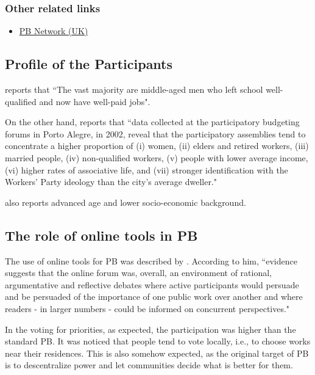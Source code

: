 \subsubsection{Other related links}
\begin{itemize}
	\item \href{http://pbnetwork.org.uk/}{PB Network (UK)}
\end{itemize}

\subsection{Profile of the Participants}
\cite{Masser2013} reports that ``The vast majority are middle-aged men who left school well-qualified and now have well-paid jobs". 

On the other hand, \cite{Goncalves2014} reports that ``data collected at the participatory budgeting forums in Porto Alegre, in 2002, reveal that the participatory assemblies tend to concentrate a higher proportion of (i) women, (ii) elders and retired workers, (iii) married people, (iv) non-qualified workers, (v) people with lower average income, (vi) higher rates of associative life, and (vii) stronger identification with the Workers’ Party ideology than the city’s average dweller."

\cite{Peixoto2009} also reports advanced age and lower socio-economic background.


\subsection{The role of online tools in PB}
The use of online tools for PB was described by \cite{Peixoto2009}. According to him, ``evidence suggests that the online forum was, overall, an environment of rational, argumentative and reflective debates where active participants would persuade and be persuaded of the importance of one public work over another and where readers - in larger numbers - could be informed on concurrent perspectives."

In the voting for priorities, as expected, the participation was higher than the standard PB. It was noticed that people tend to vote locally, i.e., to choose works near their residences. This is also somehow expected, as the original target of PB is to descentralize power and let communities decide what is better for them.

